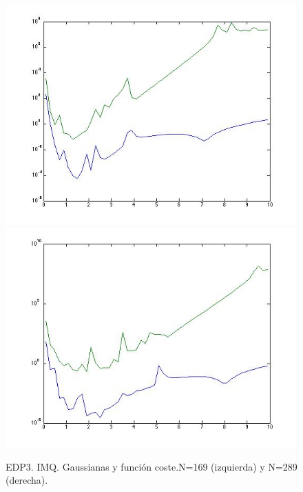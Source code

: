 \documentclass[11pt,a4paper]{article}
\begin{document}
\begin{figure}
\includegraphics[scale=.4]{edp3_169_gaussiana.jpg}
\includegraphics[scale=.4]{edp3_289_gaussiana.jpg}
\caption{EDP3. IMQ. Gaussianas y función coste.N=169 (izquierda) y N=289 (derecha).}
\end{figure}
\end{document}
